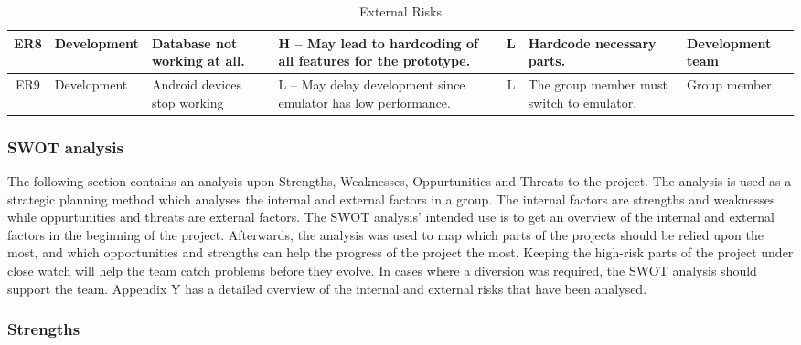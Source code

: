 \begin{landscape}
\begin{table}[h]
\begin{tabular}{  c 	 	p{1.8cm} 	 	p{4.0cm} 	 	p{4.0cm} 	  	c 	 	p{4.0cm} 	 	p{1.8cm} }
\hline
  ER8 & Development		& Database not working at all.  & H -- May lead to hardcoding of all features for the prototype. & L & Hardcode necessary parts.	& Development team \\
\hline
  ER9 & Development		& Android devices stop working  & L -- May delay development since emulator has low performance. & L & The group member must switch to emulator. 	& Group member \\
\end{tabular}
\caption{External Risks}
\label{tab:externalrisks}
\end{table}
\end{landscape}

\subsubsection{SWOT analysis}

The following section contains an analysis upon Strengths, Weaknesses, Oppurtunities and Threats 
to the project. The analysis is used as a strategic planning method which analyses the internal 
and external factors in a group. The internal factors are strengths and weaknesses while 
oppurtunities and threats are external factors. 
The SWOT analysis' intended use is to get an overview of the internal and external factors in the 
beginning of the project. Afterwards, the analysis was used to map which parts of the projects 
should be relied upon the most, and which opportunities and strengths can help the progress of 
the project the most. 
Keeping the high-risk parts of the project under close watch will help the team catch problems 
before they evolve. In cases where a diversion was required, the SWOT analysis should support the 
team. Appendix Y has a detailed overview of the internal and external risks that have been analysed. 

\subsubsection{Strengths}

